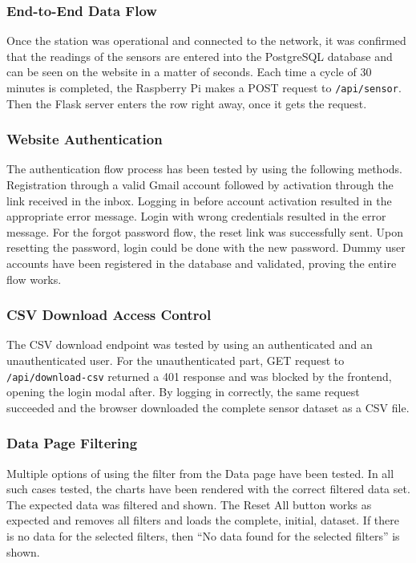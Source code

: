 \subsubsection*{End-to-End Data Flow}

Once the station was operational and connected to the network, it was confirmed that the
readings of the sensors are entered into the PostgreSQL database and can be seen on the website
in a matter of seconds. Each time a cycle of 30 minutes is completed, the Raspberry Pi makes a
POST request to \texttt{/api/sensor}. Then the Flask server enters the row right away, once it
gets the request.

\subsubsection*{Website Authentication}

The authentication flow process has been tested by using the following methods. Registration
through a valid Gmail account followed by activation through the link received in the inbox.
Logging in before account activation resulted in the appropriate error message. Login with
wrong credentials resulted in the error message. For the forgot password flow, the reset link
was successfully sent. Upon resetting the password, login could be done with the new password.
Dummy user accounts have been registered in the database and validated, proving the entire
flow works.

\subsubsection*{CSV Download Access Control}

The CSV download endpoint was tested by using an authenticated and an unauthenticated user.
For the unauthenticated part, GET request to \texttt{/api/download-csv} returned a 401
response and was blocked by the frontend, opening the login modal after. By logging in
correctly, the same request succeeded and the browser downloaded the complete sensor dataset
as a CSV file.

\subsubsection*{Data Page Filtering}

Multiple options of using the filter from the Data page have been tested. In all such cases
tested, the charts have been rendered with the correct filtered data set. The expected data
was filtered and shown. The Reset All button works as expected and removes all filters and
loads the complete, initial, dataset. If there is no data for the selected filters, then ``No
data found for the selected filters'' is shown.

